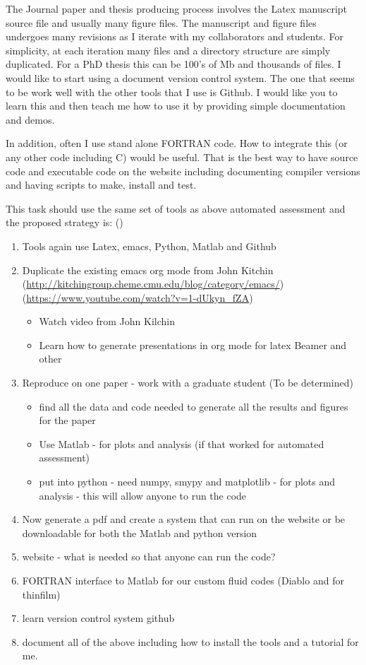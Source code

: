 \documentclass[12pt]{article}
\begin{document}
The Journal paper and thesis producing process involves the Latex manuscript source file and usually many figure files. The manuscript and figure files undergoes many revisions as I iterate with my collaborators and students. For simplicity, at each iteration many files and a directory structure are simply duplicated. For a PhD thesis this can be 100's of Mb and thousands of files. I would like to start using a document version control system. The one that seems to be work well with the other tools that I use is Github. I would like you to learn this and then teach me how to use it by providing simple documentation and demos.

In addition, often I use stand alone FORTRAN code. How to integrate this (or any other code including C) would be useful. That is the best way to have source code and executable code on the website including documenting compiler versions and having scripts to make, install and test.

This task should use the same set of tools as above automated assessment and the proposed strategy is:
(\url{})
\begin{enumerate}
  \item Tools again use Latex, emacs, Python, Matlab and Github
  \item Duplicate the existing emacs org mode from John Kitchin\\
  (\url{http://kitchingroup.cheme.cmu.edu/blog/category/emacs/})\\
  (\url{https://www.youtube.com/watch?v=1-dUkyn_fZA})
  \begin{itemize}
    \item Watch video from John Kilchin
    \item Learn how to generate presentations in org mode for latex Beamer and other
  \end{itemize}
  \item Reproduce on one paper - work with a graduate student (To be determined)
  \begin{itemize}
    \item  find all the data and code needed to generate all the results and figures for the paper
    \item  Use Matlab - for plots and analysis (if that worked for automated assessment)
    \item  put into python - need numpy, smypy and matplotlib - for plots and analysis - this will allow anyone to run the code
  \end{itemize}
  \item Now generate a pdf and create a system that can run on the website or be downloadable for both the Matlab and python version
  \item website - what is needed so that anyone can run the code?
  \item FORTRAN interface to Matlab for our custom fluid codes (Diablo and for thinfilm)
  \item learn version control system github
  \item document all of the above including how to install the tools and a tutorial for me.
\end{enumerate}
\end{document}
